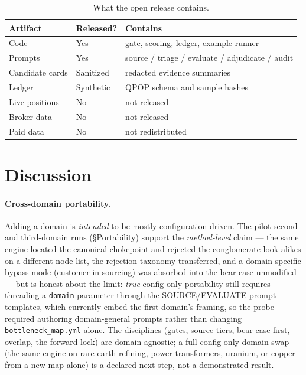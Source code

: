 \documentclass[11pt]{article}
\begin{document}
\begin{table}[H]
\centering
\begin{tabular}{lll}
\toprule
\textbf{Artifact} & \textbf{Released?} & \textbf{Contains} \\
\midrule
Code            & Yes                        & gate, scoring, ledger, example runner \\
Prompts         & Yes                        & source / triage / evaluate / adjudicate / audit \\
Candidate cards & Sanitized                  & redacted evidence summaries \\
Ledger          & Synthetic                  & QPOP schema and sample hashes \\
Live positions  & No                         & not released \\
Broker data     & No                         & not released \\
Paid data       & No                         & not redistributed \\
\bottomrule
\end{tabular}
\caption{What the open release contains.}
\label{tab:release}
\end{table}

\section{Discussion}
\paragraph{Cross-domain portability.} Adding a domain is \emph{intended} to be mostly
configuration-driven. The pilot second- and third-domain runs (\S Portability) support the \emph{method-level}
claim --- the same engine located the canonical chokepoint and rejected the conglomerate look-alikes
on a different node list, the rejection taxonomy transferred, and a domain-specific bypass mode
(customer in-sourcing) was absorbed into the bear case unmodified --- but is honest about the limit:
\emph{true} config-only portability still requires threading a \texttt{domain} parameter through the
SOURCE/EVALUATE prompt templates, which currently embed the first domain's framing, so the probe
required authoring domain-general prompts rather than changing \texttt{bottleneck\_map.yml} alone. The
disciplines (gates, source tiers, bear-case-first, overlap, the forward lock) are domain-agnostic; a
full config-only domain swap (the same engine on rare-earth refining, power transformers, uranium, or
copper from a new map alone) is a declared next step, not a demonstrated result.
\end{document}
